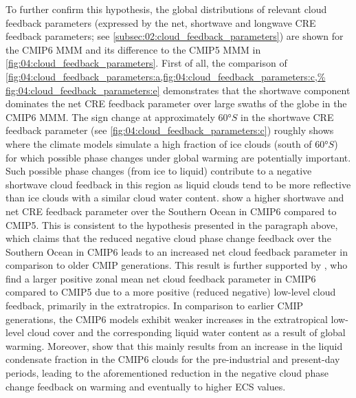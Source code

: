 To further confirm this hypothesis, the global distributions of relevant cloud
feedback parameters (expressed by the net, shortwave and longwave \ac{CRE}
feedback parameters; see \cref{subsec:02:cloud_feedback_parameters}) are shown
for the \acs{CMIP}6 \ac{MMM} and its difference to the \acs{CMIP}5 \ac{MMM} in
\cref{fig:04:cloud_feedback_parameters}. First of all, the comparison of
\cref{fig:04:cloud_feedback_parameters:a,fig:04:cloud_feedback_parameters:c,%
  fig:04:cloud_feedback_parameters:e} demonstrates that the shortwave component
dominates the net \ac{CRE} feedback parameter over large swaths of the globe
in the \acs{CMIP}6 \ac{MMM}. The sign change at approximately $60
\unit{\degree S}$ in the shortwave \ac{CRE} feedback parameter (see
\cref{fig:04:cloud_feedback_parameters:c}) roughly shows where the climate
models simulate a high fraction of ice clouds (south of $60 \unit{\degree
  S}$) for which possible phase changes under global warming are potentially
important. Such possible phase changes (from ice to liquid) contribute to a
negative shortwave cloud feedback in this region as liquid clouds tend to be
more reflective than ice clouds with a similar cloud water content.
show a higher shortwave and net \ac{CRE} feedback parameter over the Southern
Ocean in \acs{CMIP}6 compared to \acs{CMIP}5. This is consistent to the
hypothesis presented in the paragraph above, which claims that the reduced
negative cloud phase change feedback over the Southern Ocean in \acs{CMIP}6
leads to an increased net cloud feedback parameter in comparison to older
\ac{CMIP} generations. This result is further supported by
\textcite{Zelinka2020}, who find a larger positive zonal mean net cloud
feedback parameter in \acs{CMIP}6 compared to \acs{CMIP}5 due to a more
positive (reduced negative) low-level cloud feedback, primarily in the
extratropics. In comparison to earlier \acs{CMIP} generations, the
\acs{CMIP}6 models exhibit weaker increases in the extratropical low-level
cloud cover and the corresponding liquid water content as a result of global
warming. Moreover, \textcite{Zelinka2020} show that this mainly results from
an increase in the liquid condensate fraction in the \acs{CMIP}6 clouds for
the pre-industrial and present-day periods, leading to the aforementioned
reduction in the negative cloud phase change feedback on warming and
eventually to higher \ac{ECS} values.
